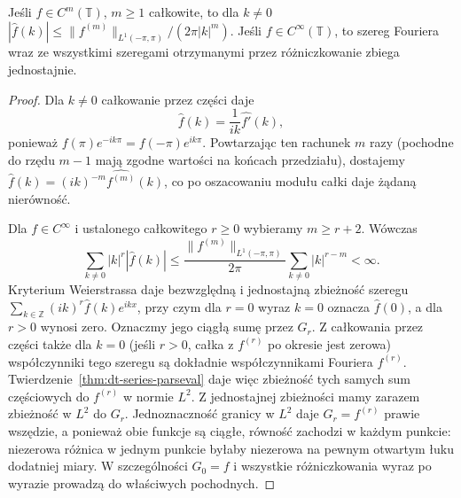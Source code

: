 \begin{lemat}
\label{lem:dt-series-decay}
Jeśli $f\in C^m(\mathbb T)$, $m\geq1$ całkowite, to dla $k\ne0$
$|\widehat f(k)|\le\|f^{(m)}\|_{L^1(-\pi,\pi)}/(2\pi|k|^m)$.
Jeśli $f\in C^\infty(\mathbb T)$, to szereg Fouriera wraz
ze wszystkimi szeregami otrzymanymi przez różniczkowanie
zbiega jednostajnie.
\end{lemat}
\begin{proof}
Dla $k\ne0$ całkowanie przez części daje
\[
 \widehat f(k)=\frac1{ik}\widehat{f'}(k),
\]
ponieważ $f(\pi)e^{-ik\pi}=f(-\pi)e^{ik\pi}$.
Powtarzając ten rachunek $m$ razy (pochodne
do rzędu $m-1$ mają zgodne wartości na końcach
przedziału), dostajemy
$\widehat f(k)=(ik)^{-m}\widehat{f^{(m)}}(k)$,
co po oszacowaniu modułu całki daje żądaną nierówność.

Dla $f\in C^\infty$ i ustalonego całkowitego
$r\geq0$ wybieramy $m\geq r+2$. Wówczas
\[
 \sum_{k\ne0}|k|^r|\widehat f(k)|
 \leq\frac{\|f^{(m)}\|_{L^1(-\pi,\pi)}}{2\pi}
 \sum_{k\ne0}|k|^{r-m}<\infty.
\]
Kryterium Weierstrassa daje bezwzględną
i jednostajną zbieżność szeregu
$\sum_{k\in\mathbb Z}(ik)^r\widehat f(k)e^{ikx}$,
przy czym dla $r=0$ wyraz $k=0$ oznacza
$\widehat f(0)$, a dla $r>0$ wynosi zero.
Oznaczmy jego ciągłą sumę przez $G_r$.
Z całkowania przez części także dla $k=0$
(jeśli $r>0$, całka z $f^{(r)}$ po okresie
jest zerowa) współczynniki tego szeregu
są dokładnie współczynnikami Fouriera $f^{(r)}$.
Twierdzenie~\ref{thm:dt-series-parseval} daje więc
zbieżność tych samych sum częściowych do $f^{(r)}$
w normie $L^2$. Z jednostajnej zbieżności
mamy zarazem zbieżność w $L^2$ do $G_r$.
Jednoznaczność granicy w $L^2$ daje
$G_r=f^{(r)}$ prawie wszędzie, a ponieważ
obie funkcje są ciągłe, równość zachodzi
w każdym punkcie: niezerowa różnica
w jednym punkcie byłaby niezerowa na
pewnym otwartym łuku dodatniej miary.
W szczególności $G_0=f$ i wszystkie
różniczkowania wyraz po wyrazie prowadzą
do właściwych pochodnych.
\end{proof}

